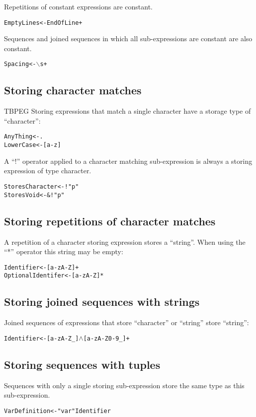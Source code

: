 \documentclass[a4paper,11pt]{article}
\begin{document}
Repetitions of constant expressions are constant.
\begin{alltt}
    EmptyLines <- EndOfLine+
\end{alltt}

Sequences and joined sequences in which all sub-expressions are constant are also constant.
\begin{alltt}
    Spacing <- \(\backslash\)s+
\end{alltt}

\subsection{Storing character matches}
TBPEG Storing expressions that match a single character have a storage type of ``character'':
\begin{alltt}
    AnyThing  <- .
    LowerCase <- [a-z]
\end{alltt}

A ``!'' operator applied to a character matching sub-expression is always a storing expression of type character.
\begin{alltt}
    StoresCharacter <- ! "p"
    StoresVoid      <- \&! "p"
\end{alltt}

\subsection{Storing repetitions of character matches}
A repetition of a character storing expression stores a ``string''.
When using the ``*'' operator this string may be empty:
\begin{alltt}
    Identifier        <- [a-zA-Z]+
    OptionalIdentifer <- [a-zA-Z]*
\end{alltt}

\subsection{Storing joined sequences with strings}
Joined sequences of expressions that store ``character'' or ``string'' store ``string'':
\begin{alltt}
    Identifier <- [a-zA-Z\_] \(\wedge\) [a-zA-Z0-9\_]+
\end{alltt}

\subsection{Storing sequences with tuples}
Sequences with only a single storing sub-expression store the same type as this sub-expression.
\begin{alltt}
    VarDefinition <- "var" Identifier
\end{alltt}
\end{document}
